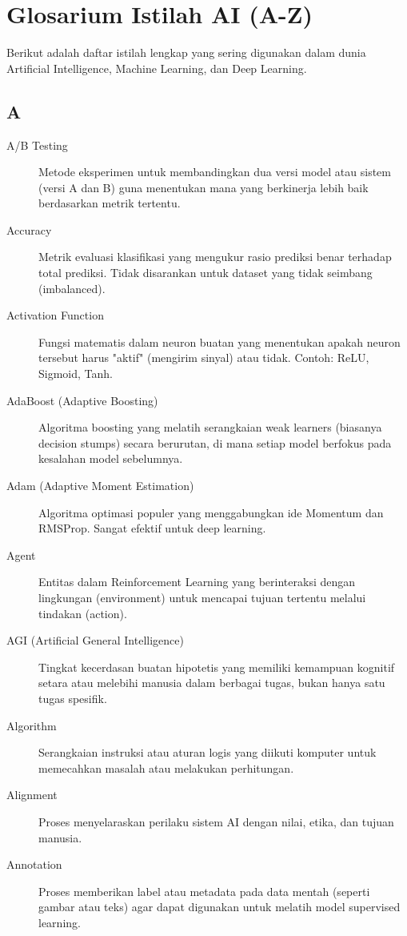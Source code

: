 \chapter{Glosarium Istilah AI (A-Z)}
\label{chap:glossary}

Berikut adalah daftar istilah lengkap yang sering digunakan dalam dunia Artificial Intelligence, Machine Learning, dan Deep Learning.

\section*{A}
\begin{description}
    \item[A/B Testing] Metode eksperimen untuk membandingkan dua versi model atau sistem (versi A dan B) guna menentukan mana yang berkinerja lebih baik berdasarkan metrik tertentu.
    \item[Accuracy] Metrik evaluasi klasifikasi yang mengukur rasio prediksi benar terhadap total prediksi. Tidak disarankan untuk dataset yang tidak seimbang (imbalanced).
    \item[Activation Function] Fungsi matematis dalam neuron buatan yang menentukan apakah neuron tersebut harus "aktif" (mengirim sinyal) atau tidak. Contoh: ReLU, Sigmoid, Tanh.
    \item[AdaBoost (Adaptive Boosting)] Algoritma boosting yang melatih serangkaian weak learners (biasanya decision stumps) secara berurutan, di mana setiap model berfokus pada kesalahan model sebelumnya.
    \item[Adam (Adaptive Moment Estimation)] Algoritma optimasi populer yang menggabungkan ide Momentum dan RMSProp. Sangat efektif untuk deep learning.
    \item[Agent] Entitas dalam Reinforcement Learning yang berinteraksi dengan lingkungan (environment) untuk mencapai tujuan tertentu melalui tindakan (action).
    \item[AGI (Artificial General Intelligence)] Tingkat kecerdasan buatan hipotetis yang memiliki kemampuan kognitif setara atau melebihi manusia dalam berbagai tugas, bukan hanya satu tugas spesifik.
    \item[Algorithm] Serangkaian instruksi atau aturan logis yang diikuti komputer untuk memecahkan masalah atau melakukan perhitungan.
    \item[Alignment] Proses menyelaraskan perilaku sistem AI dengan nilai, etika, dan tujuan manusia.
    \item[Annotation] Proses memberikan label atau metadata pada data mentah (seperti gambar atau teks) agar dapat digunakan untuk melatih model supervised learning.

\end{description}
